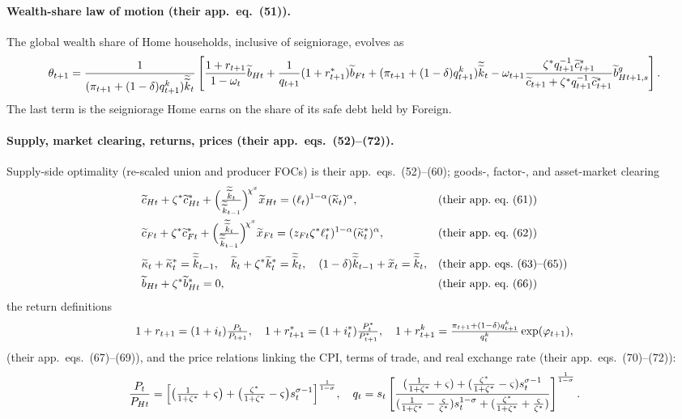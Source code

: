 \paragraph{Wealth-share law of motion (their app.\ eq.~(51)).} The global wealth
share of Home households, inclusive of seigniorage, evolves as
\begin{equation}
\label{eq:wealth-share}
\theta_{t+1}=\frac{1}{(\pi_{t+1}+(1-\delta)q^{k}_{t+1})\widetilde{\widetilde{k}}_t}
\left[\frac{1+r_{t+1}}{1-\omega_t}\widetilde{b}_{Ht}
+\frac{1}{q_{t+1}}(1+r^{*}_{t+1})\widetilde{b}_{Ft}
+(\pi_{t+1}+(1-\delta)q^{k}_{t+1})\widetilde{\widetilde{k}}_t
-\omega_{t+1}\frac{\zeta^{*}q^{-1}_{t+1}\widetilde{c}^{*}_{t+1}}{\widetilde{c}_{t+1}+\zeta^{*}q^{-1}_{t+1}\widetilde{c}^{*}_{t+1}}\widetilde{b}^g_{Ht+1,s}\right].
\end{equation}
The last term is the seigniorage Home earns on the share of its safe debt held by
Foreign.

\paragraph{Supply, market clearing, returns, prices (their app.\ eqs.~(52)--(72)).}
Supply-side optimality (re-scaled union and producer FOCs) is their app.\
eqs.~(52)--(60); goods-, factor-, and asset-market clearing
\begin{align}
\label{eq:mc-goods}
&\rs{c}_{Ht}+\zs\rs{c}^{*}_{Ht}+\Bigl(\tfrac{\widetilde{\widetilde{k}}_t}{\widetilde{\widetilde{k}}_{t-1}}\Bigr)^{\!\chi^x}\rs{x}_{Ht}=(\ell_t)^{1-\alpha}(\rs\kappa_t)^{\alpha}, &&\text{(their app.\ eq.~(61))}\\
&\rs{c}_{Ft}+\zs\rs{c}^{*}_{Ft}+\Bigl(\tfrac{\widetilde{\widetilde{k}}_t}{\widetilde{\widetilde{k}}_{t-1}}\Bigr)^{\!\chi^x}\rs{x}_{Ft}=(z_{Ft}\zs\ell^{*}_t)^{1-\alpha}(\rs\kappa^{*}_t)^{\alpha}, &&\text{(their app.\ eq.~(62))}\\
&\rs\kappa_t+\rs\kappa^{*}_t=\widetilde{\widetilde{k}}_{t-1}, \quad
\rs{k}_t+\zs\rs{k}^{*}_t=\widetilde{\widetilde{k}}_t,\quad
(1-\dep)\widetilde{\widetilde{k}}_{t-1}+\rs{x}_t=\widetilde{\widetilde{k}}_t, &&\text{(their app.\ eqs.~(63)--(65))}\\
\label{eq:mc-bonds}
&\rs{b}_{Ht}+\zs\rs{b}^{*}_{Ht}=0, &&\text{(their app.\ eq.~(66))}
\end{align}
the return definitions
\begin{equation}
\label{eq:rescaled-returns}
1+r_{t+1}=(1+i_t)\tfrac{P_t}{P_{t+1}},\quad
1+r^{*}_{t+1}=(1+i^{*}_t)\tfrac{P^{*}_t}{P^{*}_{t+1}},\quad
1+r^{k}_{t+1}=\tfrac{\pi_{t+1}+(1-\delta)q^{k}_{t+1}}{q^{k}_t}\exp(\varphi_{t+1}),
\end{equation}
(their app.\ eqs.~(67)--(69)), and the price relations linking the CPI, terms of
trade, and real exchange rate (their app.\ eqs.~(70)--(72)):
\begin{equation}
\label{eq:price-relations}
\frac{P_t}{P_{Ht}}=\Bigl[\bigl(\tfrac{1}{1+\zeta^{*}}+\varsigma\bigr)+\bigl(\tfrac{\zeta^{*}}{1+\zeta^{*}}-\varsigma\bigr)s_t^{\sigma-1}\Bigr]^{\frac1{1-\sigma}},
\quad
q_t=s_t\left[\frac{(\tfrac{1}{1+\zeta^{*}}+\varsigma)+(\tfrac{\zeta^{*}}{1+\zeta^{*}}-\varsigma)s_t^{\sigma-1}}{(\tfrac{1}{1+\zeta^{*}}-\tfrac{\varsigma}{\zeta^{*}})s_t^{1-\sigma}+(\tfrac{\zeta^{*}}{1+\zeta^{*}}+\tfrac{\varsigma}{\zeta^{*}})}\right]^{\frac1{1-\sigma}}.
\end{equation}


